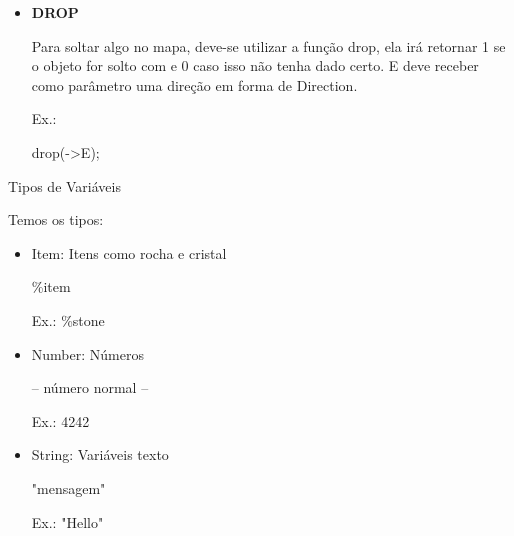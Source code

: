 \documentclass[a4paper]{article}
\begin{document}
{{{{{{{{\begin{itemize}
            \textcolor{NavyBlue}{Ex.:}
            
            drag(->NW);

        \bigskip
                
        \item \textbf{DROP}
        
            Para soltar algo no mapa, deve-se utilizar 
            a função
            \textcolor{NavyBlue}{drop},
            ela irá retornar 1 se o objeto for solto com
            e 0 caso isso não tenha dado certo.
            E deve receber como parâmetro uma direção
            em forma de Direction.

            \textcolor{NavyBlue}{Ex.:}
            
            drop(->E);
            
        \end{itemize}

\newpage %


{\textcolor{NavyBlue}{\LARGE Tipos de Variáveis}

    \bigskip
    \bigskip
    
    Temos os tipos:
        
    \begin{itemize}
        
        \item \textcolor{NavyBlue}{Item:} Itens como rocha e cristal
            
            \%item
            
            \textcolor{NavyBlue}{Ex.:} \%stone
                
        \bigskip
        
        \item \textcolor{NavyBlue}{Number:} Números
            
            -- número normal --
            
            \textcolor{NavyBlue}{Ex.:} 4242
            
        \bigskip            
            
        \item \textcolor{NavyBlue}{String:} Variáveis texto
            
            "mensagem"
            
            \textcolor{NavyBlue}{Ex.:} "Hello"         
        
        \bigskip
                         

\end{itemize}}}}}}}}}}
\end{document}
